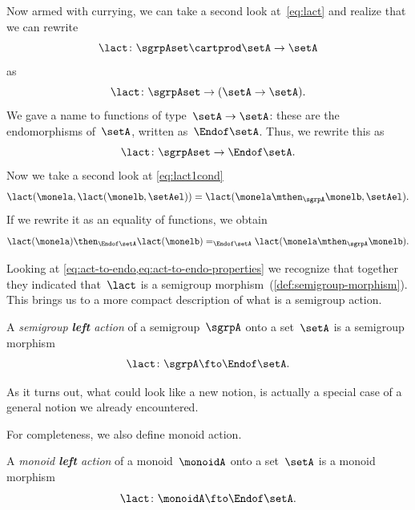 Now armed with currying, we can take a second look at~\cref{eq:lact} and realize that we can rewrite
\begin{equation}\label{eq:currying-lact-1}
\lact \colon \sgrpAset \cartprod \setA \to \setA
\end{equation}
as
\begin{equation}\label{eq:currying-lact-2}
  \lact \colon \sgrpAset \to (\setA \to \setA).
\end{equation}
We gave a name to functions of type~$\setA \to \setA$: these are the endomorphisms of~$\setA$, written as~$\Endof\setA$.
Thus, we rewrite this as
\begin{equation}\label{eq:act-to-endo}
  \lact \colon \sgrpAset \to \Endof\setA.
\end{equation}
Now we take a second look at \cref{eq:lact1cond}
\begin{equation}\label{eq:lact1cond-2}
  \lact(\monela, \lact(\monelb, \setAel)) = \lact(\monela \mthen_\sgrpA \monelb, \setAel).
\end{equation}
If we rewrite it as an equality of functions, we obtain
\begin{equation} \label{eq:act-to-endo-properties}
  \lact(\monela) \then_{\Endof\setA}  \lact(\monelb) =_{\Endof\setA} \lact(\monela \mthen_\sgrpA \monelb).
\end{equation}

Looking at \cref{eq:act-to-endo,eq:act-to-endo-properties} we recognize that together
they indicated that~$\lact$ is a semigroup morphism~(\cref{def:semigroup-morphism}). This brings us to a more compact description of what is a semigroup action.

\begin{ctdefinition}\label{def:semigroup-left-action}
  A \emph{semigroup \textbf{left} action} of a semigroup~$\sgrpA$ onto a set~$\setA$ is a semigroup morphism
  \begin{equation}\label{eq:act-semigroup}
    \lact \colon \sgrpA \fto \Endof\setA.
  \end{equation}
\end{ctdefinition}

As it turns out, what could look like a new notion, is actually a special case of a general notion we already encountered.

For completeness, we also define monoid action.

\begin{ctdefinition}\label{def:monoid-left-action}
  A \emph{monoid \textbf{left} action} of a monoid~$\monoidA$ onto a set~$\setA$ is a monoid morphism
  \begin{equation}\label{eq:act-monoid}
    \lact \colon \monoidA \fto \Endof\setA.
  \end{equation}
\end{ctdefinition}

